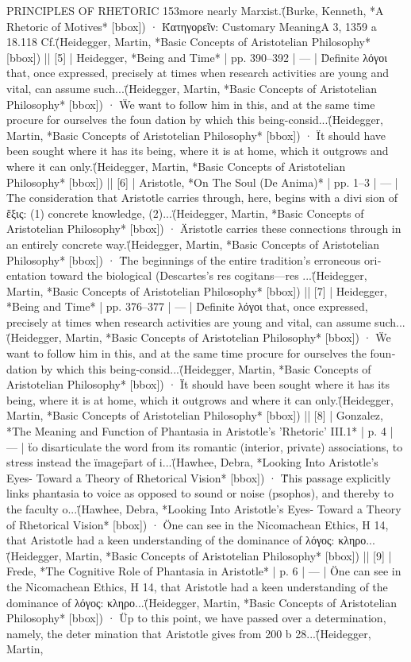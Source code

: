 {{PRINCIPLES OF RHETORIC 153\n\nsis more nearly Marxist.\" (Burke, Kenneth, *A Rhetoric of Motives* [bbox]) · \"Κατηγορεῖν: Customary Meaning\n\nRhetoric A 3, 1359 a 18.118 Cf.\" (Heidegger, Martin, *Basic Concepts of Aristotelian Philosophy* [bbox]) |\n| [5] | Heidegger, *Being and Time* | pp. 390–392 | — | \"Definite λόγοι that, once expressed, precisely at times when research activities are young and vital, can assume such...\" (Heidegger, Martin, *Basic Concepts of Aristotelian Philosophy* [bbox]) · \"We want to follow him in this, and at the same time procure for ourselves the foun­ dation by which this being-consid...\" (Heidegger, Martin, *Basic Concepts of Aristotelian Philosophy* [bbox]) · \"It should have been sought where it has its being, where it is at home, which it outgrows and where it can only\n{}.\" (Heidegger, Martin, *Basic Concepts of Aristotelian Philosophy* [bbox]) |\n| [6] | Aristotle, *On The Soul (De Anima)* | pp. 1–3 | — | \"The consideration that Aristotle carries through, here, begins with a divi­ sion of ἕξις: (1) concrete knowledge, (2)...\" (Heidegger, Martin, *Basic Concepts of Aristotelian Philosophy* [bbox]) · \"Aristotle carries these connections through in an entirely concrete way.\" (Heidegger, Martin, *Basic Concepts of Aristotelian Philosophy* [bbox]) · \"The beginnings of the entire tradition’s erroneous ori­ entation toward the biological (Descartes’s res cogitans—res ...\" (Heidegger, Martin, *Basic Concepts of Aristotelian Philosophy* [bbox]) |\n| [7] | Heidegger, *Being and Time* | pp. 376–377 | — | \"Definite λόγοι that, once expressed, precisely at times when research activities are young and vital, can assume such...\" (Heidegger, Martin, *Basic Concepts of Aristotelian Philosophy* [bbox]) · \"We want to follow him in this, and at the same time procure for ourselves the foun­ dation by which this being-consid...\" (Heidegger, Martin, *Basic Concepts of Aristotelian Philosophy* [bbox]) · \"It should have been sought where it has its being, where it is at home, which it outgrows and where it can only\n{}.\" (Heidegger, Martin, *Basic Concepts of Aristotelian Philosophy* [bbox]) |\n| [8] | Gonzalez, *The Meaning and Function of Phantasia in Aristotle's 'Rhetoric' III.1* | p. 4 | — | \"to disarticulate the word from its romantic (interior, private) associations, to stress instead the \"image\" part of i...\" (Hawhee, Debra, *Looking Into Aristotle's Eyes- Toward a Theory of Rhetorical Vision* [bbox]) · \"This passage explicitly links phantasia to voice as opposed to sound or noise (psophos), and thereby to the faculty o...\" (Hawhee, Debra, *Looking Into Aristotle's Eyes- Toward a Theory of Rhetorical Vision* [bbox]) · \"One can see in the Nicomachean Ethics, Η 14, that Aristotle had a keen understanding of the dominance of λόγος: κληρο...\" (Heidegger, Martin, *Basic Concepts of Aristotelian Philosophy* [bbox]) |\n| [9] | Frede, *The Cognitive Role of Phantasia in Aristotle* | p. 6 | — | \"One can see in the Nicomachean Ethics, Η 14, that Aristotle had a keen understanding of the dominance of λόγος: κληρο...\" (Heidegger, Martin, *Basic Concepts of Aristotelian Philosophy* [bbox]) · \"Up to this point, we have passed over a determination, namely, the deter­ mination that Aristotle gives from 200 b 28...\" (Heidegger, Martin, }}
